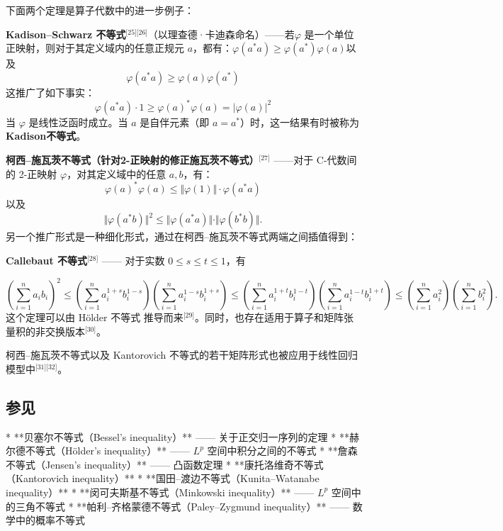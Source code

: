 下面两个定理是算子代数中的进一步例子：

\textbf{Kadison–Schwarz 不等式}\(^\text{[25][26]}\)（以理查德·卡迪森命名）——若$\varphi$ 是一个单位正映射，则对于其定义域内的任意正规元 $a$，都有：$\varphi (a^{*}a)\geq \varphi \left(a^{*}\right)\varphi (a)$以及
$$
\varphi \left(a^{*}a\right)\geq \varphi (a)\varphi \left(a^{*}\right)~
$$
这推广了如下事实：
$$
\varphi \left(a^{*}a\right)\cdot 1 \geq \varphi (a)^{*}\varphi (a) = |\varphi (a)|^{2}~
$$
当 $\varphi$ 是线性泛函时成立。当 $a$ 是自伴元素（即 $a = a^{*}$）时，这一结果有时被称为\textbf{Kadison不等式}。

\textbf{柯西–施瓦茨不等式（针对2-正映射的修正施瓦茨不等式）}\(^\text{[27]}\) ——对于 C\*-代数间的 2-正映射 $\varphi$，对其定义域中的任意 $a, b$，有：
$$
\varphi (a)^{*} \varphi (a) \leq \Vert \varphi (1) \Vert \cdot \varphi \left(a^{*}a\right)~
$$
以及
$$
\Vert \varphi \left(a^{*}b\right)\Vert ^{2} \leq \Vert \varphi \left(a^{*}a\right)\Vert \cdot \Vert \varphi \left(b^{*}b\right)\Vert.~
$$
另一个推广形式是一种细化形式，通过在柯西–施瓦茨不等式两端之间插值得到：

\textbf{Callebaut 不等式}\(^\text{[28]}\) —— 对于实数 $0 \leq s \leq t \leq 1$，有

$$
\left( \sum_{i=1}^{n} a_i b_i \right)^2 
\leq 
\left( \sum_{i=1}^{n} a_i^{1+s} b_i^{1-s} \right) \left( \sum_{i=1}^{n} a_i^{1-s} b_i^{1+s} \right)
\leq 
\left( \sum_{i=1}^{n} a_i^{1+t} b_i^{1-t} \right) \left( \sum_{i=1}^{n} a_i^{1-t} b_i^{1+t} \right)
\leq 
\left( \sum_{i=1}^{n} a_i^{2} \right) \left( \sum_{i=1}^{n} b_i^{2} \right).~
$$
这个定理可以由 Hölder 不等式 推导而来\(^\text{[29]}\)。同时，也存在适用于算子和矩阵张量积的非交换版本\(^\text{[30]}\)。

柯西–施瓦茨不等式以及 Kantorovich 不等式的若干矩阵形式也被应用于线性回归模型中\(^\text{[31][32]}\)。
\subsection{参见}

* **贝塞尔不等式（Bessel's inequality）** —— 关于正交归一序列的定理
* **赫尔德不等式（Hölder's inequality）** —— $L^p$ 空间中积分之间的不等式
* **詹森不等式（Jensen's inequality）** —— 凸函数定理
* **康托洛维奇不等式（Kantorovich inequality）**
* **国田–渡边不等式（Kunita–Watanabe inequality）**
* **闵可夫斯基不等式（Minkowski inequality）** —— $L^p$ 空间中的三角不等式
* **帕利–齐格蒙德不等式（Paley–Zygmund inequality）** —— 数学中的概率不等式


